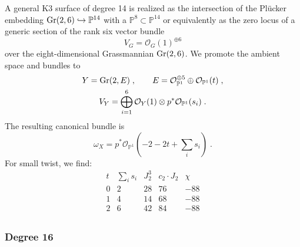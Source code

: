 \documentclass[11pt,a4paper]{article}
\numberwithin{equation}{section}
\numberwithin{table}{section}\setlength{\multlinegap}{25pt}
\begin{document}
A general K3 surface of degree 14 is realized as the intersection of the Plücker embedding $\textup{Gr}(2,6)\hookrightarrow\mathbb{P}^{14}$ with a $\mathbb{P}^8\subset\mathbb{P}^{14}$ or equivalently as the zero locus of a generic section of the rank six vector bundle~\cite{debarre2020hyperkahler}
\begin{equation}
    \label{eq:Degree14FiberDefiningBundle}
    V_G=\mathcal{O}_G(1)^{\oplus 6}
\end{equation}
over the eight-dimensional Grassmannian $\textup{Gr}(2,6)$. We promote the ambient space and bundles to
\begin{equation}
    \begin{gathered}
        Y = \textup{Gr}(2,E)\;,\qquad E = \mathcal{O}_{\mathbb{P}^1}^{\oplus 5}\oplus \mathcal{O}_{\mathbb{P}^1}(t)\;,\\
    V_Y=\bigoplus_{i=1}^{6}\mathcal{O}_Y(1)\otimes p^*\mathcal{O}_{\mathbb{P}^1}(s_i)\;.
    \end{gathered}
\end{equation}
The resulting canonical bundle is
\begin{equation}
    \omega_X=p^*\mathcal{O}_{\mathbb{P}^1}(-2-2t+\textstyle{\sum_i}s_i)\;.
\end{equation}
For small twist, we find:
\begin{equation}
    \begin{array}{ccccc}
        t & \textstyle{\sum}_{i}s_i & J_2^3 & c_2\cdot J_2 & \chi\\
        \hline
        0 & 2 & 28 & 76 & -88\\
        1 & 4 & 14 & 68 & -88\\
        2 & 6 & 42 & 84 & -88\\
    \end{array}
\end{equation}


\subsubsection*{Degree 16}
\end{document}
